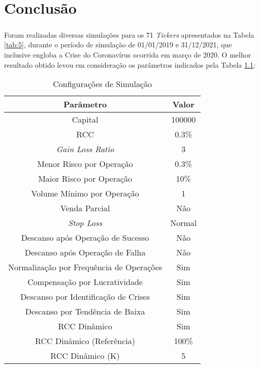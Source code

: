 \chapter{Conclusão}
\label{cap4}


\paragraph{} Foram realizadas diversas simulações para os 71 \textit{Tickers} apresentados na Tabela \ref{tab:5}, durante o período de simulação de 01/01/2019 e 31/12/2021, que inclusive engloba a Crise do Coronavírus ocorrida em março de 2020. O melhor resultado obtido levou em consideração os parâmetros indicados pela Tabela \ref{tab:100}:

\begin{table}[h!]
    \begin{center}
        \begin{tabular}{ c|c }
            Parâmetro & Valor \\
            \hline
            Capital & 100000 \\
            RCC & 0.3\% \\
            \textit{Gain Loss Ratio} & 3 \\
            Menor Risco por Operação & 0.3\% \\
            Maior Risco por Operação & 10\% \\
            Volume Mínimo por Operação & 1 \\
            Venda Parcial & Não \\
            \textit{Stop Loss} & Normal \\
            Descanso após Operação de Sucesso & Não \\
            Descanso após Operação de Falha & Não \\
            Normalização por Frequência de Operações & Sim \\
            Compensação por Lucratividade & Sim \\
            Descanso por Identificação de Crises & Sim \\
            Descanso por Tendência de Baixa & Sim \\
            RCC Dinâmico & Sim \\
            RCC Dinâmico (Referência) & 100\% \\
            RCC Dinâmico (K) & 5 \\
        \end{tabular}
        \caption{Configurações de Simulação}
        \label{tab:100}
    \end{center}
\end{table}

